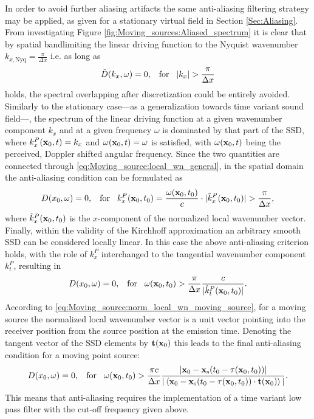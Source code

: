 In order to avoid further aliasing artifacts the same anti-aliasing filtering strategy may be applied, as given for a stationary virtual field in Section \ref{Sec:Aliasing}.
From investigating Figure \ref{fig:Moving_sources:Aliased_spectrum} it is clear that by spatial bandlimiting the linear driving function to the Nyquist wavenumber $k_{x,\mathrm{Nyq}} = \frac{\pi}{\Delta x}$ i.e. as long as 
\begin{equation}
\tilde{D}(k_x,\omega) = 0, \hspace{3mm} \text{for} \hspace{3mm}  |k_x| > \frac{\pi}{\Delta x}
\end{equation}
holds, the spectral overlapping after discretization could be entirely avoided.
Similarly to the stationary case---as a generalization towards time variant sound field---, the spectrum of the linear driving function at a given wavenumber component $k_x$ and at a given frequency $\omega$ is dominated by that part of the SSD, where $k_x^P(\mathbf{x}_0,t) = k_x$ and $\omega(\mathbf{x}_0,t) = \omega$ is satisfied, with $\omega(\mathbf{x}_0,t)$ being the perceived, Doppler shifted angular frequency.
Since the two quantities are connected through \eqref{eq:Moving_source:local_wn_general}, in the spatial domain the anti-aliasing condition can be formulated as
\begin{equation}
D(x_0,\omega) = 0, \hspace{3mm} \text{for} \hspace{3mm}  k_x^P(\mathbf{x}_0,t_0) = \frac{\omega(\mathbf{x}_0,t_0)}{c} \cdot |\hat{k}_x^P(\mathbf{x}_0,t_0)|  > \frac{\pi}{\Delta x},
\end{equation}
where $\hat{k}_x^P(\mathbf{x}_0,t_0)$ is the $x$-component of the normalized local wavenumber vector.
Finally, within the validity of the Kirchhoff approximation an arbitrary smooth SSD can be considered locally linear.
In this case the above anti-aliasing criterion holds, with the role of $k_x^P$ interchanged to the tangential wavenumber component $k_t^P$, resulting in 
\begin{equation}
D(x_0,\omega) = 0, \hspace{3mm} \text{for} \hspace{3mm} \omega(\mathbf{x}_0,t_0) > \frac{\pi}{\Delta x} \frac{c}{|\hat{k}_t^P(\mathbf{x}_0,t_0)|}.
\end{equation}
According to \eqref{eq:Moving_source:norm_local_wn_moving_source}, for a moving source the normalized local wavenumber vector is a unit vector pointing into the receiver position from the source position at the emission time.
Denoting the tangent vector of the SSD elements by $\mathbf{t}(\mathbf{x}_0)$ this leads to the final anti-aliasing condition for a moving point source:
\begin{equation}
D(x_0,\omega) = 0, \hspace{3mm} \text{for} \hspace{3mm} \omega(\mathbf{x}_0,t_0) > \frac{\pi c}{\Delta x} \frac{|\mathbf{x}_0-\mathbf{x}_{\mathrm{s}}(t_0-\tau(\mathbf{x}_0,t_0))|}
{|\left< \mathbf{x}_0-\mathbf{x}_{\mathrm{s}}(t_0-\tau(\mathbf{x}_0,t_0)) \cdot \mathbf{t}(\mathbf{x}_0) \right>|}.
\label{Eq:Moving_source:Antialiasing_cutoff_freq}
\end{equation}
This means that anti-aliasing requires the implementation of a time variant low pass filter with the cut-off frequency given above.


